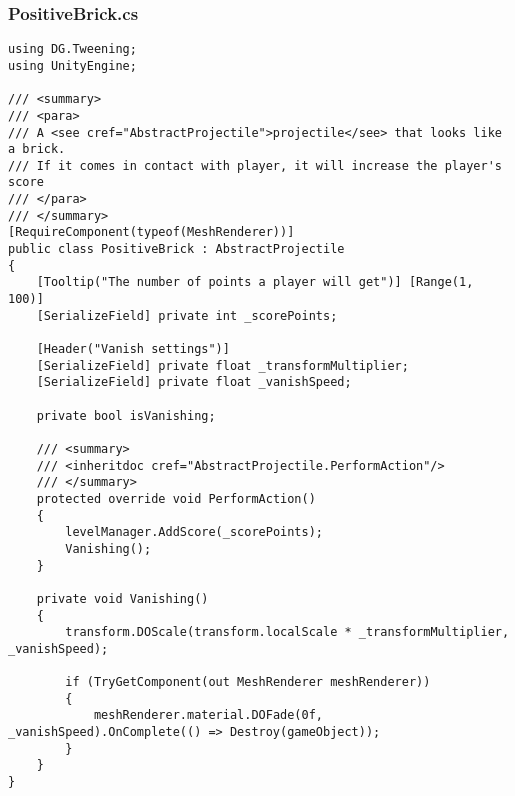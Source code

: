 \subsubsection*{PositiveBrick.cs}
\begin{verbatim}
using DG.Tweening;
using UnityEngine;

/// <summary>
/// <para>
/// A <see cref="AbstractProjectile">projectile</see> that looks like a brick.
/// If it comes in contact with player, it will increase the player's score
/// </para>
/// </summary>
[RequireComponent(typeof(MeshRenderer))]
public class PositiveBrick : AbstractProjectile
{
    [Tooltip("The number of points a player will get")] [Range(1, 100)] 
    [SerializeField] private int _scorePoints;

    [Header("Vanish settings")] 
    [SerializeField] private float _transformMultiplier;
    [SerializeField] private float _vanishSpeed;

    private bool isVanishing;

    /// <summary>
    /// <inheritdoc cref="AbstractProjectile.PerformAction"/>
    /// </summary>
    protected override void PerformAction()
    {
        levelManager.AddScore(_scorePoints);
        Vanishing();
    }

    private void Vanishing()
    {
        transform.DOScale(transform.localScale * _transformMultiplier, _vanishSpeed);

        if (TryGetComponent(out MeshRenderer meshRenderer))
        {
            meshRenderer.material.DOFade(0f, _vanishSpeed).OnComplete(() => Destroy(gameObject));
        }
    }
}
\end{verbatim}
